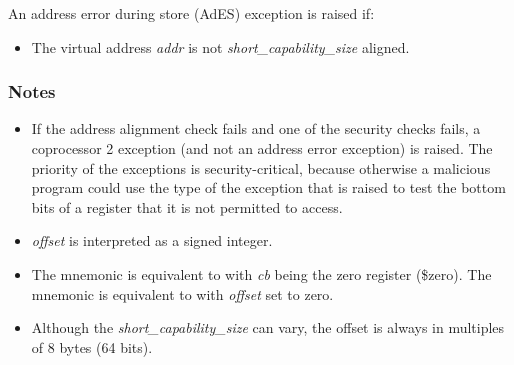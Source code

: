 \noindent
An address error during store (AdES) exception is raised if:

\begin{itemize}
\item
The virtual address \emph{addr} is not \emph{short\_capability\_size} aligned.
\end{itemize}

\subsubsection*{Notes}

\begin{itemize}
\item
If the address alignment check fails and one of the security checks fails,
a coprocessor 2 exception (and not an address error exception) is raised.
The priority of the exceptions is security-critical, because otherwise a
malicious program could use the type of the exception that is raised to
test the bottom bits of a register that it is not permitted to access.
\item
\emph{offset} is interpreted as a signed integer.
\item
The  mnemonic is equivalent to  with
\emph{cb} being the zero register (\$zero). The  mnemonic
is equivalent to  with \emph{offset} set to zero.
\item
Although the \emph{short\_capability\_size} can vary, the offset is always in
multiples of 8 bytes (64 bits).
\end{itemize}
